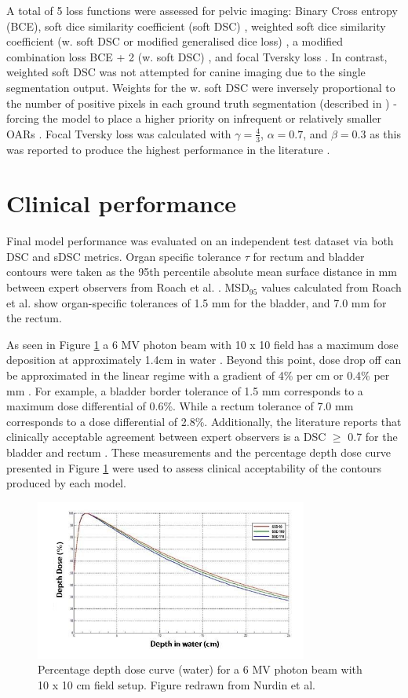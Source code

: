 A total of 5 loss functions were assessed for pelvic imaging: Binary Cross entropy (BCE), soft dice similarity coefficient (soft DSC) \cite{Bertels2019}, weighted soft dice similarity coefficient (w. soft DSC or modified generalised dice loss) \cite{Sudre_2017}, a modified combination loss BCE + 2 (w. soft DSC) \cite{taghanaki2018}, and focal Tversky loss \cite{Zhu_2018, Khan2019, abraham2018}. In contrast, weighted soft DSC was not attempted for canine imaging due to the single segmentation output. Weights for the w. soft DSC were inversely proportional to the number of positive pixels in each ground truth segmentation (described in \cite{Sudre_2017}) - forcing the model to place a higher priority on infrequent or relatively smaller OARs \cite{Sudre_2017}. Focal Tversky loss was calculated with $\gamma = \frac{4}{3}$, $\alpha=0.7$, and $\beta=0.3$ as this was reported to produce the highest performance in the literature \cite{Khan2019}.

\section{Clinical performance}

Final model performance was evaluated on an independent test dataset via both DSC and sDSC metrics. Organ specific tolerance $\tau$ for rectum and bladder contours were taken as the 95th percentile absolute mean surface distance in mm between expert observers from Roach et al. \cite{Roach_2019}. MSD$_{95}$ values calculated from Roach et al. show organ-specific tolerances of 1.5 mm for the bladder, and 7.0 mm for the rectum. 

As seen in Figure \ref{fig:pdd} a 6 MV photon beam with 10 x 10 field has a maximum dose deposition at approximately 1.4cm in water \cite{Nurdin}. Beyond this point, dose drop off can be approximated in the linear regime with a gradient of 4\% per cm or 0.4\% per mm \cite{Nurdin}. For example, a bladder border tolerance of 1.5 mm corresponds to a maximum dose differential of 0.6\%. While a rectum tolerance of 7.0 mm corresponds to a dose differential of 2.8\%. Additionally, the literature reports that clinically acceptable agreement between expert observers is a DSC $\geq$ 0.7 for the bladder and rectum \cite{Roach_2019}. These measurements and the percentage depth dose curve presented in Figure \ref{fig:pdd} were used to assess clinical acceptability of the contours produced by each model.


\begin{figure}[H]
	\begin{center}
		\includegraphics[width=0.8\textwidth]{figures/pdd}
		\caption{Percentage depth dose curve (water) for a 6 MV photon beam with 10 x 10 cm field setup. Figure redrawn from Nurdin et al. \cite{Nurdin}}
		\label{fig:pdd}
	\end{center}
\end{figure}
